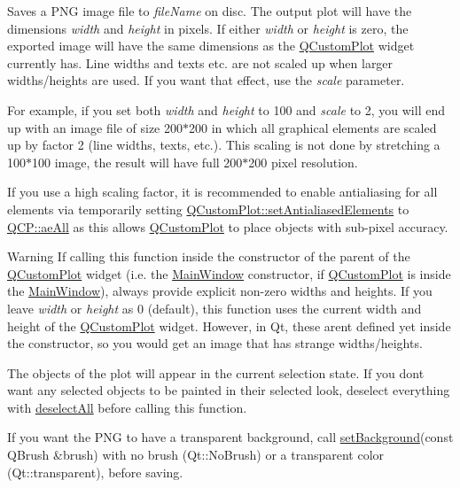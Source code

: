 Saves a P\+NG image file to {\itshape file\+Name} on disc. The output plot will have the dimensions {\itshape width} and {\itshape height} in pixels. If either {\itshape width} or {\itshape height} is zero, the exported image will have the same dimensions as the \hyperlink{class_q_custom_plot}{Q\+Custom\+Plot} widget currently has. Line widths and texts etc. are not scaled up when larger widths/heights are used. If you want that effect, use the {\itshape scale} parameter.

For example, if you set both {\itshape width} and {\itshape height} to 100 and {\itshape scale} to 2, you will end up with an image file of size 200$\ast$200 in which all graphical elements are scaled up by factor 2 (line widths, texts, etc.). This scaling is not done by stretching a 100$\ast$100 image, the result will have full 200$\ast$200 pixel resolution.

If you use a high scaling factor, it is recommended to enable antialiasing for all elements via temporarily setting \hyperlink{class_q_custom_plot_af6f91e5eab1be85f67c556e98c3745e8}{Q\+Custom\+Plot\+::set\+Antialiased\+Elements} to \hyperlink{namespace_q_c_p_ae55dbe315d41fe80f29ba88100843a0caa897c232a0ffc8368e7c100ffc59ef31}{Q\+C\+P\+::ae\+All} as this allows \hyperlink{class_q_custom_plot}{Q\+Custom\+Plot} to place objects with sub-\/pixel accuracy.

\begin{DoxyWarning}{Warning}
If calling this function inside the constructor of the parent of the \hyperlink{class_q_custom_plot}{Q\+Custom\+Plot} widget (i.\+e. the \hyperlink{class_main_window}{Main\+Window} constructor, if \hyperlink{class_q_custom_plot}{Q\+Custom\+Plot} is inside the \hyperlink{class_main_window}{Main\+Window}), always provide explicit non-\/zero widths and heights. If you leave {\itshape width} or {\itshape height} as 0 (default), this function uses the current width and height of the \hyperlink{class_q_custom_plot}{Q\+Custom\+Plot} widget. However, in Qt, these aren\textquotesingle{}t defined yet inside the constructor, so you would get an image that has strange widths/heights.
\end{DoxyWarning}
The objects of the plot will appear in the current selection state. If you don\textquotesingle{}t want any selected objects to be painted in their selected look, deselect everything with \hyperlink{class_q_custom_plot_a9d4808ab925b003054085246c92a257c}{deselect\+All} before calling this function.

If you want the P\+NG to have a transparent background, call \hyperlink{class_q_custom_plot_a130358592cfca353ff3cf5571b49fb00}{set\+Background}(const Q\+Brush \&brush) with no brush (Qt\+::\+No\+Brush) or a transparent color (Qt\+::transparent), before saving.

